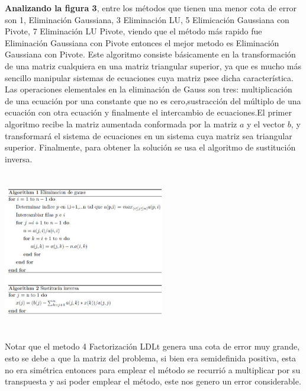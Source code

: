 \documentclass[10pt,a4paper]{article}
\begin{document}
\begin{multicols}{2}
\noindent \textbf{Analizando la figura 3}, entre los métodos que tienen una menor cota de error son 1, Eliminación Gaussiana, 3 Eliminación LU, 5 Elimicación Gaussiana con Pivote, 7 Eliminación LU Pivote, viendo que el método más rapido fue Eliminación Gaussiana con Pivote entonces el mejor metodo es Eliminación Gaussiana con Pivote. 
Este algoritmo consiste básicamente en la transformación de una matriz cualquiera en una matriz triangular superior, ya que es mucho más sencillo manipular sistemas de ecuaciones cuya matriz psee dicha característica. Las operaciones elementales en la eliminación de Gauss son tres: multiplicación de una ecuación por una constante que no es cero,sustracción del múltiplo de una ecuación con otra ecuación y finalmente el intercambio de ecuaciones.El primer algoritmo recibe la matriz aumentada conformada por la matriz $a$ y el vector $b$, y transformará el sistema de ecuaciones en un sistema cuya matriz sea triangular superior. Finalmente, para obtener la solución se usa el algoritmo de sustitución inversa. 

\begin{center}
	\centering
	\includegraphics[width=7cm,height=7cm]{algoritmos.jpg}
	\\
	
\end{center}

\noindent Notar que el metodo 4 Factorización LDLt genera una cota de error muy grande, esto se debe a que la matriz del problema, si bien era semidefinida positiva, esta no era simétrica entonces para emplear el método se recurrió a multiplicar por su transpuesta y asi poder emplear el método, este nos genero un error considerable.\\
\end{multicols}
\end{document}
